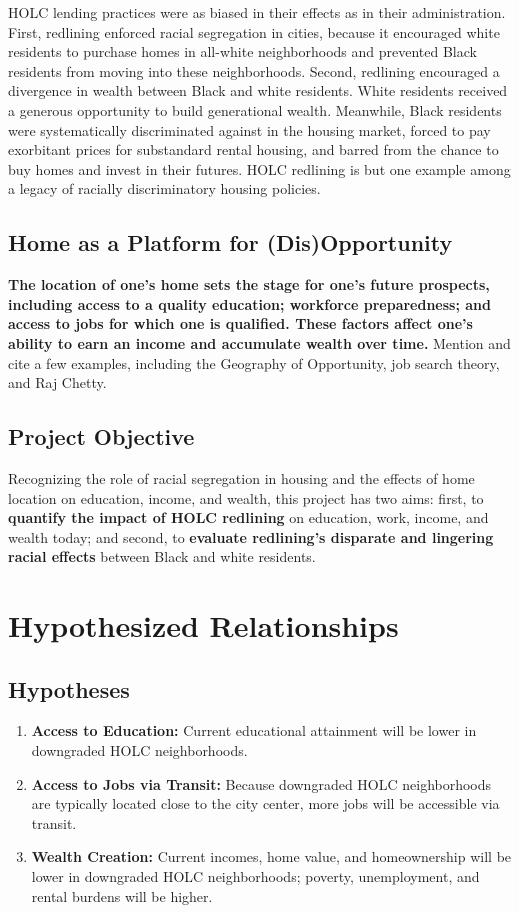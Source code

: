 \documentclass[paper=letter, fontsize=12pt]{scrartcl} %
\begin{document}
HOLC lending practices were as biased in their effects as in their administration. First, redlining enforced racial segregation in cities, because it encouraged white residents to purchase homes in all-white neighborhoods and prevented Black residents from moving into these neighborhoods. Second, redlining encouraged a divergence in wealth between Black and white residents. White residents received a generous opportunity to build generational wealth. Meanwhile, Black residents were systematically discriminated against in the housing market, forced to pay exorbitant prices for substandard rental housing, and barred from the chance to buy homes and invest in their futures. HOLC redlining is but one example among a legacy of racially discriminatory housing policies.\cite{rothstein}\par

\subsection{Home as a Platform for (Dis)Opportunity}
\textbf{The location of one's home sets the stage for one's future prospects, including access to a quality education; workforce preparedness; and access to jobs for which one is qualified. These factors affect one's ability to earn an income and accumulate wealth over time.} Mention and cite a few examples, including the Geography of Opportunity, job search theory, and Raj Chetty.\par

\subsection{Project Objective}
Recognizing the role of racial segregation in housing and the effects of home location on education, income, and wealth, this project has two aims: first, to \textbf{quantify the impact of HOLC redlining} on education, work, income, and wealth today; and second, to \textbf{evaluate redlining's disparate and lingering racial effects} between Black and white residents.\par

\section{Hypothesized Relationships}
\subsection{Hypotheses}
\begin{enumerate}
	\item \textbf{Access to Education:} Current educational attainment will be lower in downgraded HOLC neighborhoods.
	\item \textbf{Access to Jobs via Transit:} Because downgraded HOLC neighborhoods are typically located close to the city center, more jobs will be accessible via transit.
	\item \textbf{Wealth Creation:} Current incomes, home value, and homeownership will be lower in downgraded HOLC neighborhoods; poverty, unemployment, and rental burdens will be higher.
\end{enumerate}
\end{document}

